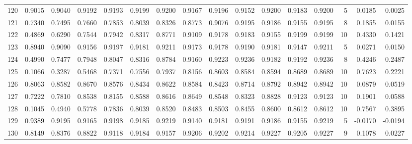 \begin{tabular}{lrrrrrrrrrrrrrrr}
120 &      0.9015 &  0.9040 &  0.9192 &  0.9193 &  0.9199 &  0.9200 &  0.9167 &  0.9196 &  0.9152 &  0.9200 &   0.9183 &     0.9200 &      5 &                    0.0185 &                     0.0025 \\
121 &      0.7340 &  0.7495 &  0.7660 &  0.7853 &  0.8039 &  0.8326 &  0.8773 &  0.9076 &  0.9195 &  0.9186 &   0.9155 &     0.9195 &      8 &                    0.1855 &                     0.0155 \\
122 &      0.4869 &  0.6290 &  0.7544 &  0.7942 &  0.8317 &  0.8771 &  0.9109 &  0.9178 &  0.9183 &  0.9155 &   0.9199 &     0.9199 &     10 &                    0.4330 &                     0.1421 \\
123 &      0.8940 &  0.9090 &  0.9156 &  0.9197 &  0.9181 &  0.9211 &  0.9173 &  0.9178 &  0.9190 &  0.9181 &   0.9147 &     0.9211 &      5 &                    0.0271 &                     0.0150 \\
124 &      0.4990 &  0.7477 &  0.7948 &  0.8047 &  0.8316 &  0.8784 &  0.9160 &  0.9223 &  0.9236 &  0.9182 &   0.9192 &     0.9236 &      8 &                    0.4246 &                     0.2487 \\
125 &      0.1066 &  0.3287 &  0.5468 &  0.7371 &  0.7556 &  0.7937 &  0.8156 &  0.8603 &  0.8584 &  0.8594 &   0.8689 &     0.8689 &     10 &                    0.7623 &                     0.2221 \\
126 &      0.8063 &  0.8582 &  0.8670 &  0.8576 &  0.8434 &  0.8622 &  0.8584 &  0.8423 &  0.8714 &  0.8792 &   0.8942 &     0.8942 &     10 &                    0.0879 &                     0.0519 \\
127 &      0.7222 &  0.7810 &  0.8538 &  0.8155 &  0.8588 &  0.8616 &  0.8649 &  0.8548 &  0.8323 &  0.8828 &   0.9123 &     0.9123 &     10 &                    0.1901 &                     0.0588 \\
128 &      0.1045 &  0.4940 &  0.5778 &  0.7836 &  0.8039 &  0.8520 &  0.8483 &  0.8503 &  0.8455 &  0.8600 &   0.8612 &     0.8612 &     10 &                    0.7567 &                     0.3895 \\
129 &      0.9389 &  0.9195 &  0.9165 &  0.9198 &  0.9185 &  0.9219 &  0.9140 &  0.9181 &  0.9191 &  0.9186 &   0.9155 &     0.9219 &      5 &                   -0.0170 &                    -0.0194 \\
130 &      0.8149 &  0.8376 &  0.8822 &  0.9118 &  0.9184 &  0.9157 &  0.9206 &  0.9202 &  0.9214 &  0.9227 &   0.9205 &     0.9227 &      9 &                    0.1078 &                     0.0227 \\

\end{tabular}
